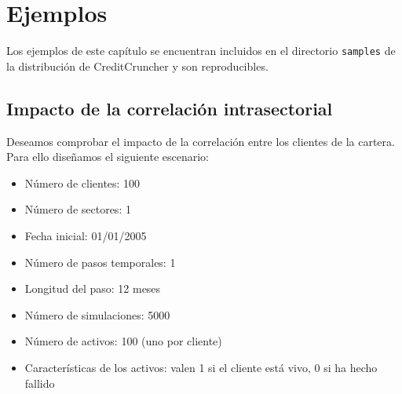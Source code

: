 
%
%
%
%
%
%
%
%

\chapter{Ejemplos}
\label{sec:examples}

Los ejemplos de este cap\'itulo se encuentran incluidos en el directorio
\verb+samples+ de la distribuci\'on de CreditCruncher y son reproducibles.

\section{Impacto de la correlaci\'on intrasectorial}

Deseamos comprobar el impacto de la correlaci\'on entre los clientes de la 
cartera. Para ello dise\~namos el siguiente escenario:

\begin{itemize}
\item N\'umero de clientes: 100
\item N\'umero de sectores: 1
\item Fecha inicial: 01/01/2005
\item N\'umero de pasos temporales: 1
\item Longitud del paso: 12 meses
\item N\'umero de simulaciones: 5000
\item N\'umero de activos: 100 (uno por cliente)
\item Caracter\'isticas de los activos: valen 1 si el cliente est\'a vivo, 0 si 
ha hecho fallido
\end{itemize}

